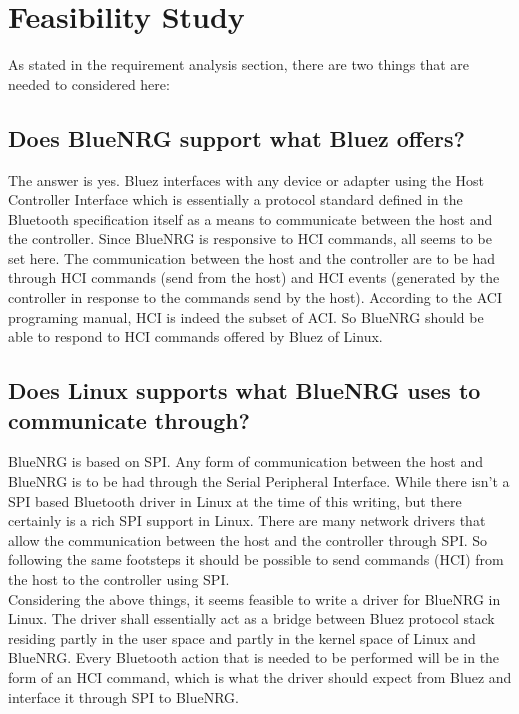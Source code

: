 \section{Feasibility Study}
As stated in the requirement analysis section, there are two things that are needed to considered here:
\subsection{ Does BlueNRG support what Bluez offers?}
The answer is yes. Bluez interfaces with any device or adapter using the Host Controller Interface which is essentially a protocol standard defined in the Bluetooth specification itself as a means to communicate between the host and the controller. Since BlueNRG is responsive to HCI commands, all seems to be set here. The communication between the host and the controller are to be had through HCI commands (send from the host) and HCI events (generated by the controller in response to the commands send by the host). According to the ACI programing manual, HCI is indeed the subset of ACI. So BlueNRG should be able to respond to HCI commands offered by Bluez of Linux.
\subsection{Does Linux supports what BlueNRG uses to communicate through?}
BlueNRG is based on SPI. Any form of communication between the host and BlueNRG is to be had through the Serial Peripheral Interface. While there isn’t a SPI based Bluetooth driver in Linux at the time of this writing, but there certainly is a rich SPI support in Linux. There are many network drivers that allow the communication between the host and the controller through SPI. So following the same footsteps it should be possible to send commands (HCI) from the host to the controller using SPI.\\
Considering the above things, it seems feasible to write a driver for BlueNRG in Linux. The driver shall essentially act as a bridge between Bluez protocol stack residing partly in the user space and partly in the kernel space of Linux and BlueNRG. Every Bluetooth action that is needed to be performed will be in the form of an HCI command, which is what the driver should expect from Bluez and interface it through SPI to BlueNRG.
